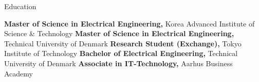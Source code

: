 
\begin{rubric}{\faGraduationCap[solid] Education}

\entry*[2021 -- 2023][]%
	\textbf{Master of Science in Electrical Engineering,} Korea Advanced Institute of Science \& Technology
%
\entry*[2021 -- 2023][]%
	\textbf{Master of Science in Electrical Engineering,} Technical University of Denmark
% 
\entry*[2020][]%
	\textbf{Research Student (Exchange),} Tokyo Institute of Technology
%
\entry*[2018 -- 2020][]%
	\textbf{Bachelor of Electrical Engineering,} Technical University of Denmark
% 
\entry*[2013 -- 2015][]%
	\textbf{Associate in IT-Technology,} Aarhus Business Academy 
% 
\end{rubric}